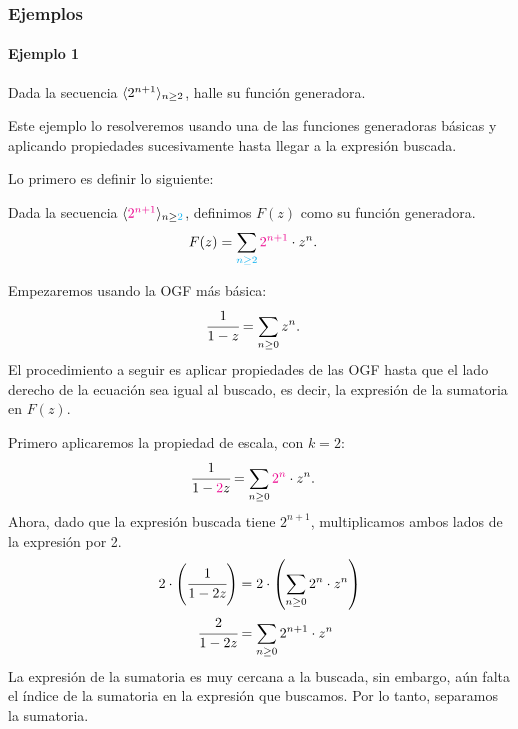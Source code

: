 \subsubsection*{Ejemplos}
\paragraph{Ejemplo 1} Dada la secuencia $\langle2^{n+1}\rangle_{n\geq 2}$, halle su función generadora.

Este ejemplo lo resolveremos usando una de las funciones generadoras básicas y aplicando propiedades sucesivamente hasta llegar a la expresión buscada.

Lo primero es definir lo siguiente:

Dada la secuencia $\langle{\color{magenta}2^{n+1}}\rangle_{n\geq {\color{cyan}2}}$, definimos $F(z)$ como su función generadora.
\begin{align*}
    F(z)&=\sum_{{\color{cyan}n\geq2}}{{\color{magenta}2^{n+1}}\cdot z^n}.
\end{align*}

Empezaremos usando la OGF más básica:
\begin{align*}
    \cfrac{1}{1-z}&=\sum_{n\geq0}{z^n}.
\end{align*}
El procedimiento a seguir es aplicar propiedades de las OGF hasta que el lado derecho de la ecuación sea igual al buscado, es decir, la expresión de la sumatoria en $F(z)$.

Primero aplicaremos la propiedad de escala, con $k=2$:
\begin{align*}
    \cfrac{1}{1-{\color{magenta}2}z}&=\sum_{n\geq0}{{\color{magenta}2^n}\cdot z^n}.
\end{align*}
Ahora, dado que la expresión buscada tiene $2^{n+1}$, multiplicamos ambos lados de la expresión por 2.
\begin{align*}
    2\cdot\left(\cfrac{1}{1-2z}\right)&=2\cdot\left(\sum_{n\geq0}{2^n\cdot z^n}\right)\\
    \cfrac{2}{1-2z}&=\sum_{n\geq0}{2^{n+1}\cdot z^n}
\end{align*}
La expresión de la sumatoria es muy cercana a la buscada, sin embargo, aún falta el índice de la sumatoria en la expresión que buscamos. Por lo tanto, separamos la sumatoria.

